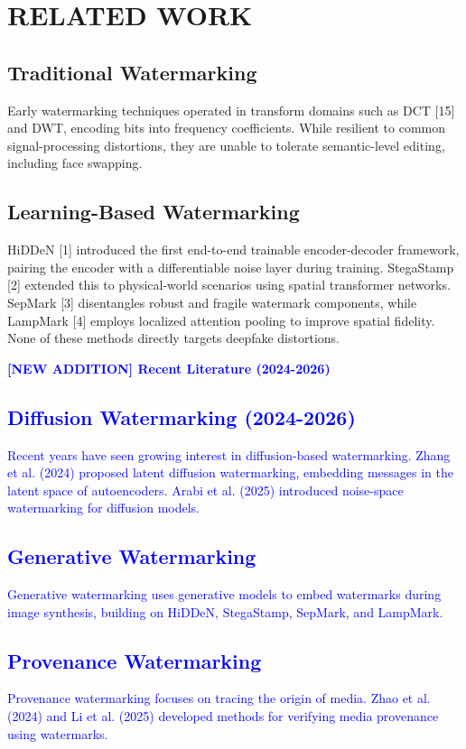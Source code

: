 \documentclass{article}
\begin{document}
\section{RELATED WORK}
\subsection{Traditional Watermarking}
Early watermarking techniques operated in transform domains such as DCT [15] and DWT, encoding bits into frequency coefficients. While resilient to common signal-processing distortions, they are unable to tolerate semantic-level editing, including face swapping.

\subsection{Learning-Based Watermarking}
HiDDeN [1] introduced the first end-to-end trainable encoder-decoder framework, pairing the encoder with a differentiable noise layer during training. StegaStamp [2] extended this to physical-world scenarios using spatial transformer networks. SepMark [3] disentangles robust and fragile watermark components, while LampMark [4] employs localized attention pooling to improve spatial fidelity. None of these methods directly targets deepfake distortions.

\vspace{1em}
\textcolor{blue}{\textbf{[NEW ADDITION] Recent Literature (2024-2026)}}

\textcolor{blue}{
\subsection{Diffusion Watermarking (2024-2026)}
Recent years have seen growing interest in diffusion-based watermarking. Zhang et al. (2024) proposed latent diffusion watermarking, embedding messages in the latent space of autoencoders. Arabi et al. (2025) introduced noise-space watermarking for diffusion models.

\subsection{Generative Watermarking}
Generative watermarking uses generative models to embed watermarks during image synthesis, building on HiDDeN, StegaStamp, SepMark, and LampMark.

\subsection{Provenance Watermarking}
Provenance watermarking focuses on tracing the origin of media. Zhao et al. (2024) and Li et al. (2025) developed methods for verifying media provenance using watermarks.
}
\end{document}
